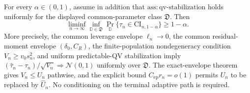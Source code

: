 For every \(\alpha\in(0,1)\), assume in addition that \(\mathrm{ass:qv\text{-}stabilization}\) holds uniformly for the displayed common-parameter class \(\mathfrak D\). Then \[\liminf_{n\to\infty}\inf_{\mathbb D\in\mathfrak D}\Pr_{\mathbb D}\{\tau_n\in\mathrm{CI}_{n,1-\alpha}\}\ge1-\alpha.\] More precisely, the common leverage envelope \(\ell_n\to0\), the common residual-moment envelope \((\delta_0,C_R)\), the finite-population nondegeneracy condition \(V_n\ge v_0s_n^2\), and uniform predictable-QV stabilization imply \((\widehat\tau_n-\tau_n)/\sqrt{V_n}\Rightarrow\mathcal N(0,1)\) uniformly over \(\mathfrak D\). The exact-envelope theorem gives \(V_n\le U_n\) pathwise, and the explicit bound \(C_{\mathrm{ep}}r_n=o(1)\) permits \(U_n\) to be replaced by \(\widehat U_n\). No conditioning on the terminal adaptive path is required.